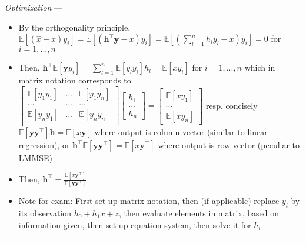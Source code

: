 \emph{Optimization} ---
\begin{itemize}
    \item By the orthogonality principle, $\mathbb{E} [ ( \hat{x} - x ) y_i ] = \mathbb{E} [ ( \boldsymbol{h}^\intercal \boldsymbol{y} - x ) y_i ] = \mathbb{E} [ ( \sum_{l=1}^n h_l y_l - x ) y_i ] = 0$ for $i = 1, ..., n$
    \item Then, $ \boldsymbol{h}^\intercal \mathbb{E}[\boldsymbol{y}y_i] = \sum_{l=1}^n \mathbb{E}[ y_l y_i ] h_l = \mathbb{E}[ x y_i ]$ for $i = 1, ..., n$ which in matrix notation corresponds to
    $\begin{bmatrix}
    \mathbb{E}[y_1 y_1] & ... & \mathbb{E}[y_1 y_n]\\
    ... & ... & ...\\
    \mathbb{E}[y_n y_1] & ... & \mathbb{E}[y_n y_n]\\
    \end{bmatrix} 
    \begin{bmatrix}
    h_1 \\
    ... \\
    h_n
    \end{bmatrix} = 
    \begin{bmatrix}
    \mathbb{E}[x y_1]\\
    ...\\
    \mathbb{E}[x y_n]
    \end{bmatrix}$
    resp. concisely
    $\mathbb{E}[ \boldsymbol{y} \boldsymbol{y}^\intercal ] \boldsymbol{h} = \mathbb{E}[x  \boldsymbol{y}]$ where output is column vector (similar to linear regression), or $\boldsymbol{h}^\intercal\mathbb{E}[ \boldsymbol{y} \boldsymbol{y}^\intercal ] = \mathbb{E}[x  \boldsymbol{y}^\intercal]$ where output is row vector (peculiar to LMMSE)
    \item Then, $\boldsymbol{h}^\intercal = \frac{\mathbb{E}[x  \boldsymbol{y}^\intercal]}{\mathbb{E}[ \boldsymbol{y} \boldsymbol{y}^\intercal ]}$ 
    \item Note for exam: First set up matrix notation, then (if applicable) replace $y_i$ by its observation $h_0 + h_1x + z$, then evaluate elements in matrix, based on information given, then set up equation system, then solve it for $h_i$
\end{itemize}

{\color{lightgray}\hrule height 0.001mm}

